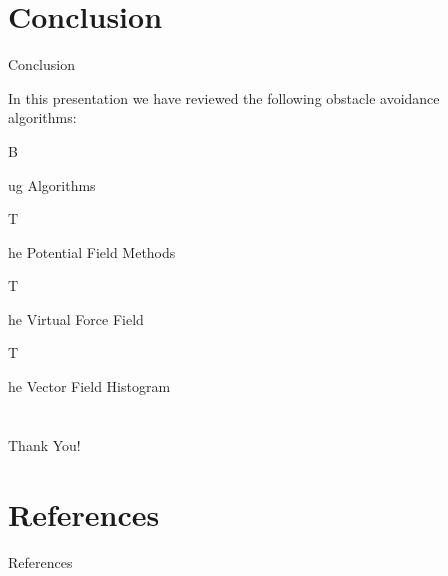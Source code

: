 \documentclass[8pt]{beamer}
\newcommand{\Ytri}{$\triangleright$ }
\renewcommand{\|}[1][.3em]{\hspace{#1}|\hspace{#1}}
\renewcommand{\,}[1][.3em]{,\hspace{#1}}
\newcommand{\subitem}[1]{{\setlength\itemindent{12pt}\item[\Ytri] #1}}
\begin{document}
\section{Conclusion}
\begin{frame}{Conclusion}
\begin{itemize}
\item In this presentation we have reviewed the following obstacle avoidance algorithms:
    \subitem Bug Algorithms
    \subitem The Potential Field Methods
    \subitem The Virtual Force Field
    \subitem The Vector Field Histogram
\end{itemize}
\end{frame}
\section{}
\begin{frame}
    \begin{center}
    \vspace{5em}
    {\fontsize{20}{50}\selectfont Thank You!}
    \end{center}
\end{frame}

\section{References}
\begin{frame}{References}
    \nocite{*}
    {\scriptsize
    
    
    }
\end{frame}

\appendix
\end{document}
